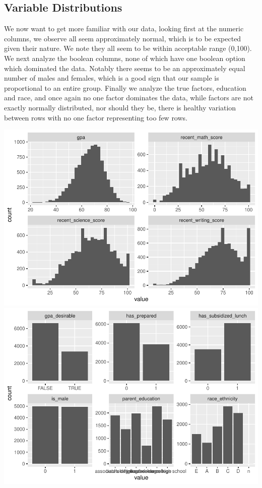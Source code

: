 \documentclass[
]{article}
\begin{document}
\subsection{Variable Distributions}\label{variable-distributions}

We now want to get more familiar with our data, looking first at the
numeric columns, we observe all seem approximately normal, which is to
be expected given their nature. We note they all seem to be within
acceptable range (0,100). We next analyze the boolean columns, none of
which have one boolean option which dominated the data. Notably there
seems to be an approximately equal number of males and females, which is
a good sign that our sample is proportional to an entire group. Finally
we analyze the true factors, education and race, and once again no one
factor dominates the data, while factors are not exactly normally
distributed, nor should they be, there is healthy variation between rows
with no one factor representing too few rows.

\includegraphics{ST494_FP_files/figure-latex/unnamed-chunk-5-1.pdf}
\includegraphics{ST494_FP_files/figure-latex/unnamed-chunk-5-2.pdf}
\end{document}
